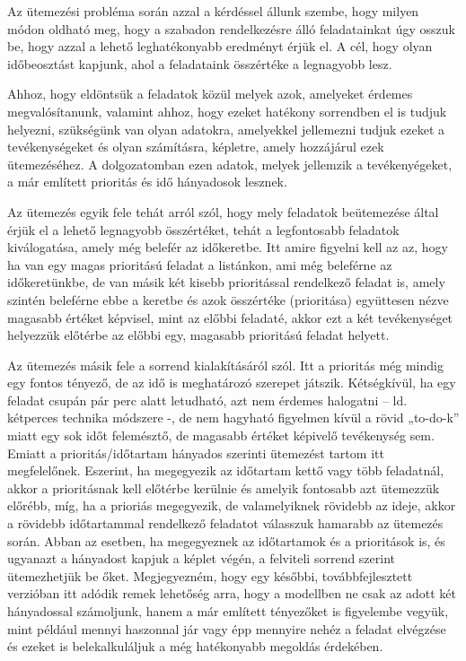 

Az ütemezési probléma során azzal a kérdéssel állunk szembe, hogy milyen módon oldható meg, hogy a szabadon rendelkezésre álló feladatainkat úgy osszuk be, hogy azzal a lehető leghatékonyabb eredményt érjük el. A cél, hogy olyan időbeosztást kapjunk, ahol a feladataink összértéke a legnagyobb lesz. 

Ahhoz, hogy eldöntsük a feladatok közül melyek azok, amelyeket érdemes megvalósítanunk, valamint ahhoz, hogy ezeket hatékony sorrendben el is tudjuk helyezni, szükségünk van olyan adatokra, amelyekkel jellemezni tudjuk ezeket a tevékenységeket és olyan számításra, képletre, amely hozzájárul ezek ütemezéséhez. A dolgozatomban ezen adatok, melyek jellemzik a tevékenyégeket, a már említett prioritás és idő hányadosok lesznek. 

Az ütemezés egyik fele tehát arról szól, hogy mely feladatok beütemezése által érjük el a lehető legnagyobb összértéket, tehát a legfontosabb feladatok kiválogatása, amely még belefér az időkeretbe. Itt amire figyelni kell az az, hogy ha van egy magas prioritású feladat a listánkon, ami még beleférne az időkeretünkbe, de van másik két kisebb prioritással rendelkező feladat is, amely szintén beleférne ebbe a keretbe és azok összértéke (prioritása) együttesen nézve magasabb értéket képvisel, mint az előbbi feladaté, akkor ezt a két tevékenységet helyezzük előtérbe az előbbi egy, magasabb prioritású feladat helyett.

Az ütemezés másik fele a sorrend kialakításáról szól. Itt a prioritás még mindig egy fontos tényező, de az idő is meghatározó szerepet játszik. Kétségkívül, ha egy feladat csupán pár perc alatt letudható, azt nem érdemes halogatni – ld. kétperces technika módszere -, de nem hagyható figyelmen kívül a rövid „to-do-k” miatt egy sok időt felemésztő, de magasabb értéket képivelő tevékenység sem. Emiatt a prioritás/időtartam hányados szerinti ütemezést tartom itt megfelelőnek. Eszerint, ha megegyezik az időtartam kettő vagy több feladatnál, akkor a prioritásnak kell előtérbe kerülnie és amelyik fontosabb azt ütemezzük előrébb, míg, ha a prioriás megegyezik, de valamelyiknek rövidebb az ideje, akkor a rövidebb időtartammal rendelkező feladatot válasszuk hamarabb az ütemezés során. Abban az esetben, ha megegyeznek az időtartamok és a prioritások is, és ugyanazt a hányadost kapjuk a képlet végén, a felviteli sorrend szerint ütemezhetjük be őket. Megjegyezném, hogy egy későbbi, továbbfejlesztett verzióban itt adódik remek lehetőség arra, hogy a modellben ne csak az adott két hányadossal számoljunk, hanem a már említett tényezőket is figyelembe vegyük, mint például mennyi haszonnal jár vagy épp mennyire nehéz a feladat elvégzése és ezeket is belekalkuláljuk a még hatékonyabb megoldás érdekében.

